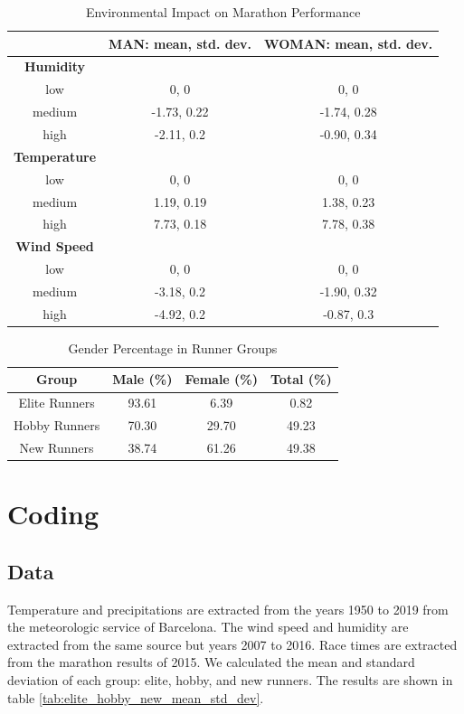 \documentclass[conference]{IEEEtran}
\begin{document}
\begin{table}[htbp]
\caption{Environmental Impact on Marathon Performance}
\begin{center}
\begin{tabular}{|c|c|c|}
\hline
\textbf{} & \textbf{MAN: mean, std. dev.} & \textbf{WOMAN: mean, std. dev.} \\
\hline
\textbf{Humidity} & & \\
\hline
low & 0, 0 & 0, 0 \\
\hline
medium & -1.73, 0.22 & -1.74, 0.28 \\
\hline
high & -2.11, 0.2 & -0.90, 0.34 \\
\hline
\textbf{Temperature} & & \\
\hline
low & 0, 0 & 0, 0 \\
\hline
medium & 1.19, 0.19 & 1.38, 0.23 \\
\hline
high & 7.73, 0.18 & 7.78, 0.38 \\
\hline
\textbf{Wind Speed} & & \\
\hline
low & 0, 0 & 0, 0 \\
\hline
medium & -3.18, 0.2 & -1.90, 0.32 \\
\hline
high & -4.92, 0.2 & -0.87, 0.3 \\
\hline
\end{tabular}
\label{tab:environmental_impact}
\end{center}
\end{table}

\begin{table}[htbp]
\caption{Gender Percentage in Runner Groups}
\begin{center}
\begin{tabular}{|c|c|c|c|}
\hline
\textbf{Group} & \textbf{Male (\%)} & \textbf{Female (\%)} & \textbf{Total (\%)} \\
\hline
Elite Runners & 93.61 & 6.39 & 0.82 \\
\hline
Hobby Runners & 70.30 & 29.70 & 49.23 \\
\hline
New Runners & 38.74 & 61.26 & 49.38 \\
\hline
\end{tabular}
\label{tab:gender_percentage}
\end{center}
\end{table}

\section{Coding}
\subsection{Data}
Temperature and precipitations are extracted from the years 1950 to 2019 from the meteorologic service of Barcelona. The wind speed and humidity are extracted from the same source but years 2007 to 2016.
Race times are extracted from the marathon results of 2015. We calculated the mean and standard deviation of each group: elite, hobby, and new runners. The results are shown in table \ref{tab:elite_hobby_new_mean_std_dev}.
\end{document}
